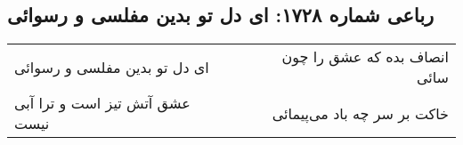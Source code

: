 \begin{center}
\section*{رباعی شماره ۱۷۲۸: ای دل تو بدین مفلسی و رسوائی}
\label{sec:1728}
\begin{longtable}{l p{0.5cm} r}
ای دل تو بدین مفلسی و رسوائی
&&
انصاف بده که عشق را چون سائی
\\
عشق آتش تیز است و ترا آبی نیست
&&
خاکت بر سر چه باد می‌پیمائی
\\
\end{longtable}
\end{center}
